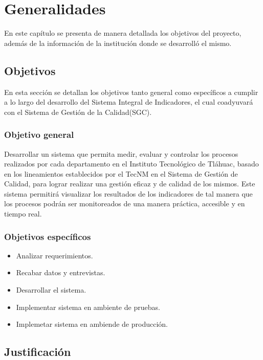 \chapter{Generalidades}
    En este cap\'itulo se presenta de manera detallada los objetivos del proyecto, adem\'as de la informaci\'on de la instituci\'on donde se desarroll\'o el mismo.
    
    \section{Objetivos}
    En esta secci\'on se detallan los objetivos tanto general como espec\'ificos a cumplir a lo largo del desarrollo del Sistema Integral de Indicadores, el cual coadyuvar\'a con el Sistema de Gesti\'on de la Calidad(SGC).

\subsection{Objetivo general}

Desarrollar un sistema que permita medir, evaluar y controlar los procesos realizados por cada departamento en el Instituto Tecnol\'ogico de Tl\'ahuac, basado en los lineamientos establecidos por el TecNM en el Sistema de Gesti\'on de Calidad, para lograr realizar una gesti\'on eficaz y de calidad de los mismos.
Este sistema permitir\'a visualizar los resultados de los indicadores de tal manera que los procesos podr\'an ser monitoreados de una manera pr\'actica, accesible y en tiempo real.


\subsection{Objetivos espec\'ificos}
\begin{itemize}
    \item Analizar requerimientos.
    \item Recabar datos y entrevistas.
    \item Desarrollar el sistema.
    \item Implementar sistema en ambiente de pruebas.
    \item Implemetar sistema en ambiende de producci\'on.
\end{itemize}

\section{Justificaci\'on}
\paragraph{}%

